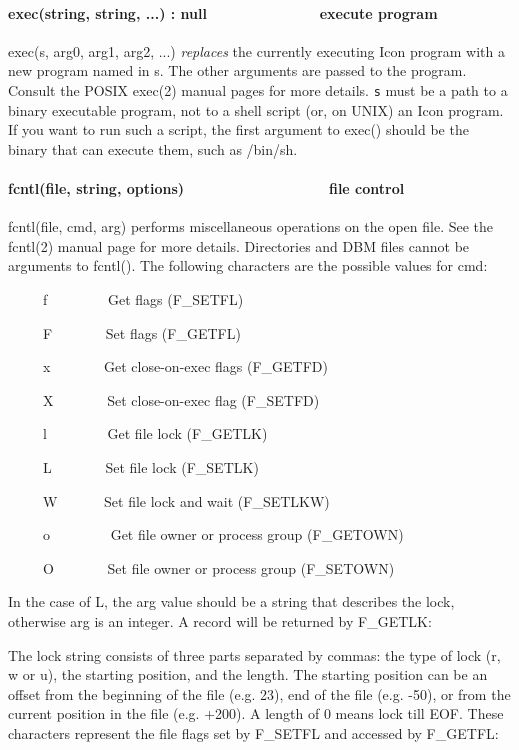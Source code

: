 \paragraph[exec(string, string, ...) : null\ \ \ \ \ \ \ \ \ \ 
\ \ \ \ execute program]{exec(string, string, ...) :
null\ \ \ \ \ \ \ \ \ \  \ \ \ \ execute program}
exec(s, arg0, arg1, arg2, ...) \textit{replaces} the currently executing
Icon program with a new program named in s. The other arguments are
passed to the program. Consult the POSIX exec(2) manual pages for more
details. \texttt{s} must be a path to a binary executable program, not
to a shell script (or, on UNIX) an Icon program. If you want to run
such a script, the first argument to exec() should be the binary that
can execute them, such as /bin/sh.

\paragraph[fcntl(file, string, options)\ \ \ \ \ \ \ \ \ \ \ \ \ \ 
\ \ \ \ file control]{fcntl(file, string,
options)\ \ \ \ \ \ \ \ \ \ \ \ \ \  \ \ \ \ file control}
fcntl(file, cmd, arg) performs miscellaneous operations on the open
file. See the fcntl(2) manual page for more details. Directories and
DBM files cannot be arguments to fcntl(). The following characters are
the possible values for cmd: 

\ \ \ \ \ f \ \ \ \ \ \ \ \ Get flags (F\_SETFL)

\ \ \ \ \ F \ \ \ \ \ \ \ Set flags (F\_GETFL)

\ \ \ \ \ x \ \ \ \ \ \ \ Get close-on-exec flags (F\_GETFD)

\ \ \ \ \ X \ \ \ \ \ \ \ Set close-on-exec flag (F\_SETFD)

\ \ \ \ \ l \ \ \ \ \ \ \ \ Get file lock (F\_GETLK)

\ \ \ \ \ L \ \ \ \ \ \ \ Set file lock (F\_SETLK)

\ \ \ \ \ W \ \ \ \ \ \ Set file lock and wait (F\_SETLKW)

\ \ \ \ \ o \ \ \ \ \ \ \ \ Get file owner or process group (F\_GETOWN)

\ \ \ \ \ O \ \ \ \ \ \ \ Set file owner or process group (F\_SETOWN)

In the case of L, the arg value should be a string that describes the
lock, otherwise arg is an integer. A record will be returned by
F\_GETLK: 


The lock string consists of three parts separated by commas: the type of
lock (r, w or u), the starting position, and the length. The starting
position can be an offset from the beginning of the file (e.g. 23), end
of the file (e.g. -50), or from the current position in the file (e.g.
+200). A length of 0 means lock till EOF. These characters represent
the file flags set by F\_SETFL and accessed by F\_GETFL: 

